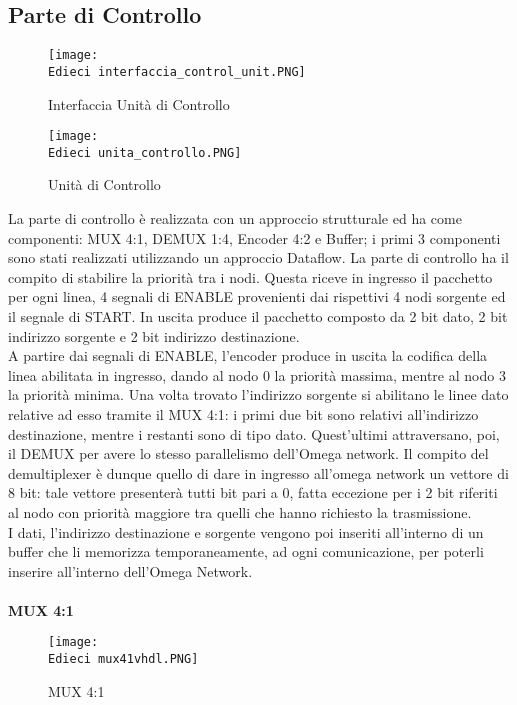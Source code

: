 \documentclass[12pt]{article}
\def \Edieci {Allegati/Esercizio10/}
\begin{document}
\subsection{Parte di Controllo}
\begin{figure}[ht!]
    \centering
    \texttt{[image: \\Edieci interfaccia\_control\_unit.PNG]}
    \caption{Interfaccia Unità di Controllo}
\end{figure}
\begin{figure}[ht!]
    \centering
    \texttt{[image: \\Edieci unita\_controllo.PNG]}
    \caption{Unità di Controllo}
\end{figure}
\newpage
La parte di controllo è realizzata con un approccio strutturale ed ha come componenti: MUX 4:1, DEMUX 1:4, Encoder 4:2 e Buffer; i primi 3 componenti sono stati realizzati utilizzando un approccio Dataflow. La parte di controllo ha il compito di stabilire la priorità tra i nodi. Questa riceve in ingresso il pacchetto per ogni linea, 4 segnali di ENABLE provenienti dai rispettivi 4 nodi sorgente ed il segnale di START. In uscita produce il pacchetto composto da 2 bit dato, 2 bit indirizzo sorgente e 2 bit indirizzo destinazione.
\\A partire dai segnali di ENABLE, l’encoder produce in uscita la codifica della linea abilitata in ingresso, dando al nodo 0 la priorità massima, mentre al nodo 3 la priorità minima. Una volta trovato l’indirizzo sorgente si abilitano le linee dato relative ad esso tramite il MUX 4:1: i primi due bit sono relativi all’indirizzo destinazione, mentre i restanti sono di tipo dato. Quest’ultimi attraversano, poi, il DEMUX per avere lo stesso parallelismo dell’Omega network. Il compito del demultiplexer è dunque quello di dare in ingresso all’omega network un vettore di 8 bit: tale vettore presenterà tutti bit pari a 0, fatta eccezione per i 2 bit riferiti al nodo con priorità maggiore tra quelli che hanno richiesto la trasmissione.
\\I dati, l’indirizzo destinazione e sorgente vengono poi inseriti all’interno di un buffer che li memorizza temporaneamente, ad ogni comunicazione, per poterli inserire all’interno dell’Omega Network.
\\\\{\large \textbf{MUX 4:1}}
\begin{figure}[ht!]
    \centering
    \texttt{[image: \\Edieci mux41vhdl.PNG]}
    \caption{MUX 4:1}
\end{figure}
\end{document}
